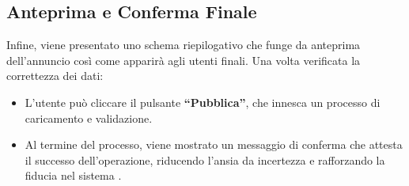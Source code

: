 \subsection*{Anteprima e Conferma Finale}
Infine, viene presentato uno schema riepilogativo che funge da anteprima dell’annuncio così come apparirà agli utenti finali. Una volta verificata la correttezza dei dati:
\begin{itemize}
    \item L’utente può cliccare il pulsante \textbf{“Pubblica”}, che innesca un processo di caricamento e validazione.
    \item Al termine del processo, viene mostrato un messaggio di conferma che attesta il successo dell’operazione, riducendo l’ansia da incertezza e rafforzando la fiducia nel sistema \cite{nielsen1995}.
\end{itemize}

\newpage











